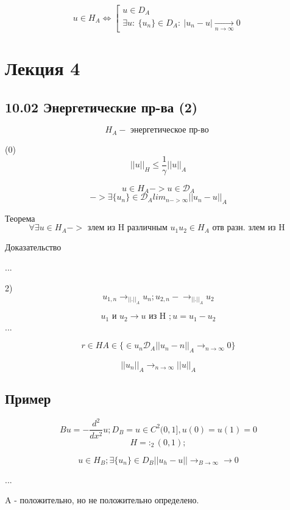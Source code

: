 \documentclass[12pt, a4paper]{article}
\begin{document}
\[ u \in H_A \Leftrightarrow \left[ \begin{array}{l}
	u \in D_A \\
	\exists u : \ \{ u_n \} \in D_A: \ | u_n - u | \underset{n \rightarrow \infty}{\rightarrow} 0
\end{array} \right. \]

\newpage

\section{Лекция 4}

\subsection{10.02 Энергетические пр-ва (2)}

\[ H_A -\textrm{ энергетическое пр-во } \]

(0) \[ {||u||}_H \leq \frac{1}{\gamma   } {||u||}_A \]

\[ u \in H_A -> u \in \mathcal{D}_A \]
\[ -> \exists \{ u_n \} \in \mathcal{D}_A  {lim}_{n-> \infty} || u_n-u||_A \]

Теорема 
\[ \forall \exists u \in H_A -> \textrm{  злем из H различным } u_1 u_2 \in H_A \textrm{ отв разн. злем из H }\]

Доказательство 

...

2) \[  u_{1, n} \rightarrow_{||.||_A} u_n; u_{2,n} -\rightarrow_{||.||_A} u_2\]

\[ u_1 \textrm{ и  } u_2 \rightarrow u \textrm{ из H }; u = u_1 - u_2\]
...

\[  r \in H A \in \{ \in u_n \mathcal{D}_A ||u_n -n ||_A \rightarrow_{n \rightarrow \infty} 0 \} \]

\[ || u_n ||_A \rightarrow_{n \rightarrow \infty} ||u||_A \]



\subsection{Пример}

\[ Bu = - \frac{d^2}{d x^2} u ; D_{B} = {u \in C^2 (0,1]}, u(0) = u(1) = 0 \]
\[ H = :_2 (0, 1); \]

\[ u \in H_B; \exists \{ u_n \} \in D_B || u_h - u || \rightarrow_{B \rightarrow \infty} \rightarrow 0\]

...

A - положительно, но не положительно определено.
\end{document}

